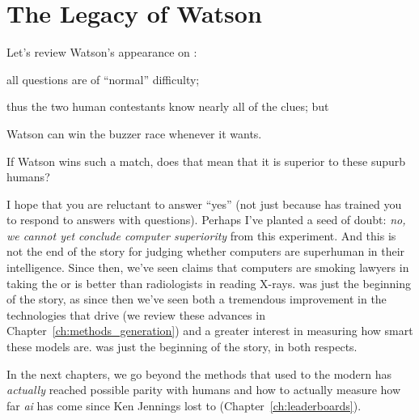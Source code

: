 
\section{The Legacy of Watson}


Let's review Watson's appearance on \jeopardy{}:
\begin{enumerate*}
        \item all questions are of ``normal'' difficulty;
        \item thus the two human contestants know nearly all of the clues; but
        \item Watson can win the buzzer race whenever it wants.
\end{enumerate*}
If Watson wins such a match, does that mean that it is superior to
these supurb humans?

I hope that you are reluctant to answer ``yes'' (not just
because \jeopardy{} has trained you to respond to answers with
questions).
%
Perhaps I've planted a seed of doubt: \emph{no, we cannot yet conclude
  computer superiority} from this experiment.
%
And this is not the end of the story for judging whether computers are
superhuman in their intelligence.
%
Since then, we've seen claims that computers are smoking lawyers in taking the
 or is better than radiologists in reading X-rays.
%
\watson{} was just the beginning of the story, as since then we've seen both a
tremendous improvement in the technologies that drive  (we review
these advances in Chapter~\ref{ch:methods_generation}) and a greater
interest in measuring how smart these models are.
%
\watson{} was just the beginning of the story, in both respects.


In the next chapters, we go beyond the methods that \watson{} used to the
modern  has \emph{actually} reached possible parity with humans and
how to actually measure how far \emph{ai} has come since Ken Jennings lost to
\watson (Chapter~\ref{ch:leaderboards}).
